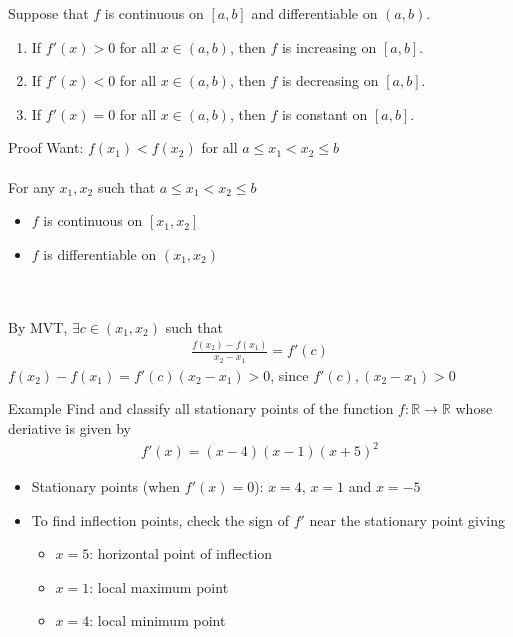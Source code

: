 \documentclass{report}
\begin{document}
		Suppose that $f$ is continuous on $[a,b]$ and differentiable on $(a,b)$.
		\begin{enumerate}
			\item If $f'(x) > 0$  for all $x \in (a,b)$, then $f$ is increasing on $[a,b]$.
			\item If $f'(x) < 0$  for all $x \in (a,b)$, then $f$ is decreasing on $[a,b]$.
			\item If $f'(x) = 0$  for all $x \in (a,b)$, then $f$ is constant on $[a,b]$.
		\end{enumerate}
		\begin{question}{Proof}
			Want: $f(x_1) < f(x_2)$ for all $a \leq x_1 < x_2 \leq b$
			\\ \\
			For any $x_1,x_2$ such that $a \leq x_1 < x_2 \leq b$
			\begin{itemize}
				\item $f$ is continuous on $[x_1,x_2]$
				\item $f$ is differentiable on $(x_1,x_2)$
			\end{itemize}

			\\ \\
			By MVT, $\exists c \in (x_1, x_2)$ such that
			\begin{align*}
				\frac{f(x_2) - f(x_1)}{x_2 - x_1} = f'(c)
			\end{align*}
			$f(x_2) - f(x_1) = f'(c)(x_2-x_1) > 0$, since $f'(c), (x_2-x_1) > 0$
		\end{question}

		\begin{question}{Example}
			Find and classify all stationary points of the function $f:\mathbb{R} \rightarrow \mathbb{R}$ whose deriative is given by
			\begin{align*}
				f'(x) = (x-4)(x-1)(x+5)^2
			\end{align*}

			\begin{itemize}
				\item Stationary points (when $f'(x) = 0$): $x = 4$, $x=1$ and $x=-5$
				\item To find inflection points, check the sign of $f'$ near the stationary point giving
					\begin{itemize}
						\item $x = 5$: horizontal point of inflection
						\item $x = 1$: local maximum point
						\item $x = 4$: local minimum point
					\end{itemize}
			\end{itemize}
		\end{question}
\end{document}
